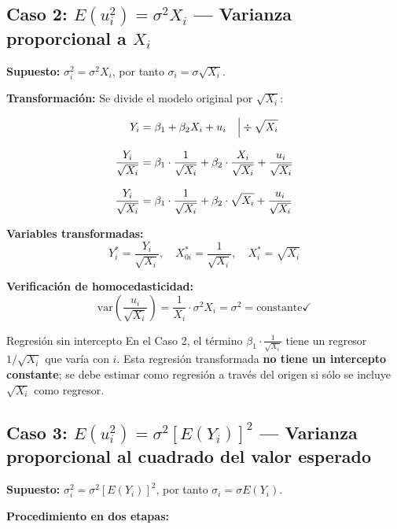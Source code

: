 \documentclass[12pt,a4paper]{article}
\begin{document}
\subsection{Caso 2: $E(u_i^2) = \sigma^2 X_i$ --- Varianza proporcional a $X_i$}

\textbf{Supuesto:} $\sigma_i^2 = \sigma^2 X_i$, por tanto $\sigma_i = \sigma\sqrt{X_i}$.

\textbf{Transformación:} Se divide el modelo original por $\sqrt{X_i}$:

\begin{align}
Y_i &= \beta_1 + \beta_2 X_i + u_i \quad \Big| \div \sqrt{X_i} \notag \\[8pt]
\frac{Y_i}{\sqrt{X_i}} &= \beta_1 \cdot \frac{1}{\sqrt{X_i}} + \beta_2 \cdot \frac{X_i}{\sqrt{X_i}} + \frac{u_i}{\sqrt{X_i}} \\[8pt]
\frac{Y_i}{\sqrt{X_i}} &= \beta_1 \cdot \frac{1}{\sqrt{X_i}} + \beta_2 \cdot \sqrt{X_i} + \frac{u_i}{\sqrt{X_i}}
\end{align}

\textbf{Variables transformadas:}
\begin{equation}
Y_i^* = \frac{Y_i}{\sqrt{X_i}}, \quad X_{0i}^* = \frac{1}{\sqrt{X_i}}, \quad X_i^* = \sqrt{X_i}
\end{equation}

\textbf{Verificación de homocedasticidad:}
\begin{equation}
\text{var}\left(\frac{u_i}{\sqrt{X_i}}\right) = \frac{1}{X_i} \cdot \sigma^2 X_i = \sigma^2 = \text{constante} \checkmark
\end{equation}

\begin{nota}{Regresión sin intercepto}
En el Caso 2, el término $\beta_1 \cdot \frac{1}{\sqrt{X_i}}$ tiene un regresor $1/\sqrt{X_i}$ que varía con $i$. Esta regresión transformada \textbf{no tiene un intercepto constante}; se debe estimar como regresión a través del origen si sólo se incluye $\sqrt{X_i}$ como regresor.
\end{nota}

\subsection{Caso 3: $E(u_i^2) = \sigma^2 [E(Y_i)]^2$ --- Varianza proporcional al cuadrado del valor esperado}

\textbf{Supuesto:} $\sigma_i^2 = \sigma^2 [E(Y_i)]^2$, por tanto $\sigma_i = \sigma E(Y_i)$.

\textbf{Procedimiento en dos etapas:}
\end{document}
